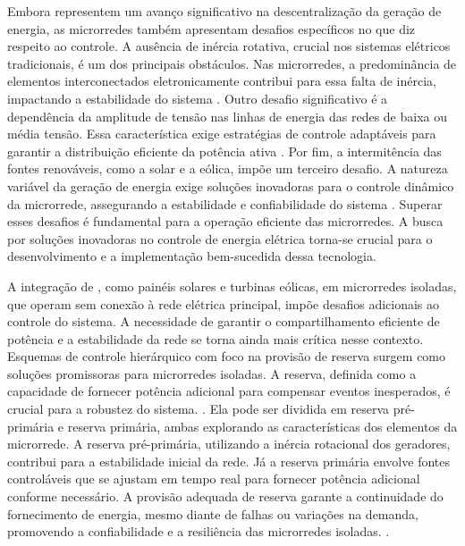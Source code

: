 Embora representem um avanço significativo na descentralização da geração de energia, as microrredes também apresentam desafios específicos no que diz respeito ao controle. A ausência de inércia rotativa, crucial nos sistemas elétricos tradicionais, é um dos principais obstáculos. Nas microrredes, a predominância de elementos interconectados eletronicamente contribui para essa falta de inércia, impactando a estabilidade do sistema \cite{Paigi2013}. Outro desafio significativo é a dependência da amplitude de tensão nas linhas de energia das redes de baixa ou média tensão. Essa característica exige estratégias de controle adaptáveis para garantir a distribuição eficiente da potência ativa \cite{Paigi2013}. Por fim, a intermitência das fontes renováveis, como a solar e a eólica, impõe um terceiro desafio. A natureza variável da geração de energia exige soluções inovadoras para o controle dinâmico da microrrede, assegurando a estabilidade e confiabilidade do sistema \cite{Paigi2013}. Superar esses desafios é fundamental para a operação eficiente das microrredes. A busca por soluções inovadoras no controle de energia elétrica torna-se crucial para o desenvolvimento e a implementação bem-sucedida dessa tecnologia.

A integração de , como painéis solares e turbinas eólicas, em microrredes isoladas, que operam sem conexão à rede elétrica principal, impõe desafios adicionais ao controle do sistema. A necessidade de garantir o compartilhamento eficiente de potência e a estabilidade da rede se torna ainda mais crítica nesse contexto. Esquemas de controle hierárquico com foco na provisão de reserva surgem como soluções promissoras para microrredes isoladas. A reserva, definida como a capacidade de fornecer potência adicional para compensar eventos inesperados, é crucial para a robustez do sistema.  \cite{Paigi2013}. Ela pode ser dividida em reserva pré-primária e reserva primária, ambas explorando as características dos elementos da microrrede. A reserva pré-primária, utilizando a inércia rotacional dos geradores, contribui para a estabilidade inicial da rede. Já a reserva primária envolve fontes controláveis que se ajustam em tempo real para fornecer potência adicional conforme necessário. A provisão adequada de reserva garante a continuidade do fornecimento de energia, mesmo diante de falhas ou variações na demanda, promovendo a confiabilidade e a resiliência das microrredes isoladas. \cite{Paigi2013}.

